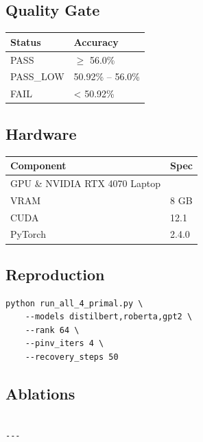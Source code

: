 \subsection{Quality Gate}

\begin{table}[H]
\centering
\small
\begin{tabular}{ll}
\toprule
\textbf{Status} & \textbf{Accuracy} \\
\midrule
PASS & $\ge$ 56.0\% \\
PASS\_LOW & 50.92\% -- 56.0\% \\
FAIL & < 50.92\% \\
\bottomrule
\end{tabular}
\end{table}

\subsection{Hardware}

\begin{table}[H]
\centering
\small
\begin{tabular}{ll}
\toprule
\textbf{Component} & \textbf{Spec} \\
\midrule
GPU \& NVIDIA RTX 4070 Laptop \\
VRAM & 8 GB \\
CUDA & 12.1 \\
PyTorch & 2.4.0 \\
\bottomrule
\end{tabular}
\end{table}

\subsection{Reproduction}

\begin{lstlisting}
python run_all_4_primal.py \
    --models distilbert,roberta,gpt2 \
    --rank 64 \
    --pinv_iters 4 \
    --recovery_steps 50
\end{lstlisting}

\subsection{Ablations}

\begin{lstlisting}

---
\end{lstlisting}